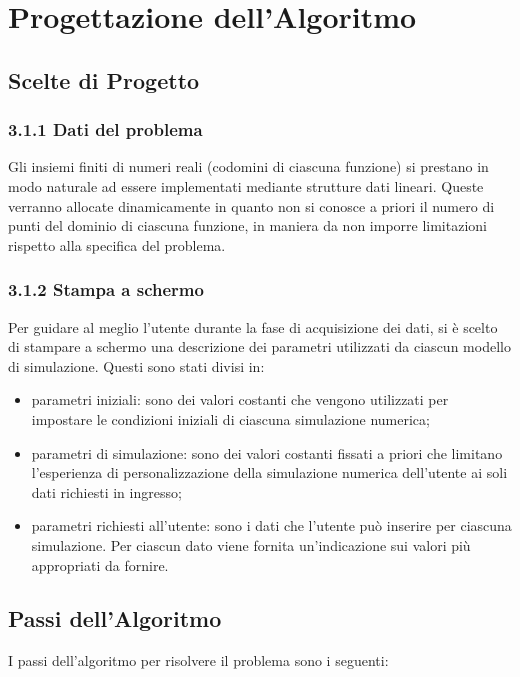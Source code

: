 \section{Progettazione dell'Algoritmo}
\subsection{Scelte di Progetto}

\subsubsection*{3.1.1 Dati del problema}
Gli insiemi finiti di numeri reali (codomini di ciascuna funzione) si prestano in modo naturale ad essere implementati mediante strutture dati lineari. Queste verranno allocate dinamicamente in quanto non si conosce a priori il numero di punti del dominio di ciascuna funzione, in maniera da non imporre limitazioni rispetto alla specifica del problema.

\subsubsection*{3.1.2 Stampa a schermo}
Per guidare al meglio l'utente durante la fase di acquisizione dei dati, si è scelto di stampare a schermo una descrizione dei parametri utilizzati da ciascun modello di simulazione. Questi sono stati divisi in:
\begin{itemize}
\item parametri iniziali: sono dei valori costanti che vengono utilizzati per impostare le condizioni iniziali di ciascuna simulazione numerica;
\item parametri di simulazione: sono dei valori costanti fissati a priori che limitano l'esperienza di personalizzazione della simulazione numerica dell'utente ai soli dati richiesti in ingresso;
\item parametri richiesti all'utente: sono i dati che l'utente può inserire per ciascuna simulazione. Per ciascun dato viene fornita un'indicazione sui valori più appropriati da fornire. 
\end{itemize} 


\subsection{Passi dell'Algoritmo}
I passi dell'algoritmo per risolvere il problema sono i seguenti:

